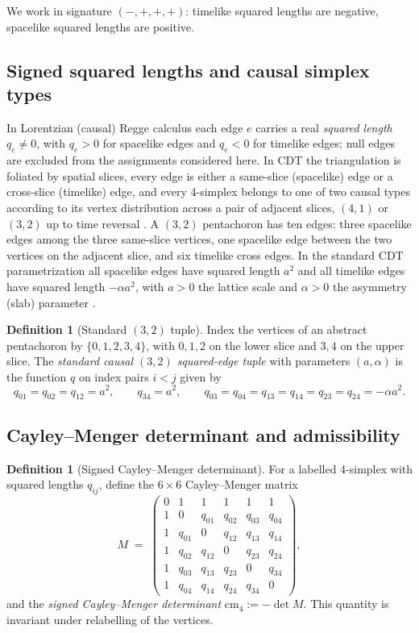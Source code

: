 \documentclass[11pt]{article}
\theoremstyle{definition}
\newtheorem{definition}[theorem]{Definition}
\theoremstyle{remark}
\newcommand{\cm}{\mathrm{cm}_{4}}
\begin{document}
We work in signature $(-,+,+,+)$: timelike squared lengths are negative, spacelike squared lengths are positive.

\subsection{Signed squared lengths and causal simplex types}

In Lorentzian (causal) Regge calculus each edge $e$ carries a real \emph{squared length} $q_{e}\ne 0$, with $q_{e}>0$ for spacelike edges and $q_{e}<0$ for timelike edges; null edges are excluded from the assignments considered here. In CDT the triangulation is foliated by spatial slices, every edge is either a same-slice (spacelike) edge or a cross-slice (timelike) edge, and every 4-simplex belongs to one of two causal types according to its vertex distribution across a pair of adjacent slices, $(4,1)$ or $(3,2)$ up to time reversal \cite{AJL,Loll}. A $(3,2)$ pentachoron has ten edges: three spacelike edges among the three same-slice vertices, one spacelike edge between the two vertices on the adjacent slice, and six timelike cross edges. In the standard CDT parametrization all spacelike edges have squared length $a^{2}$ and all timelike edges have squared length $-\alpha a^{2}$, with $a>0$ the lattice scale and $\alpha>0$ the asymmetry (slab) parameter \cite{AJL}.

\begin{definition}[Standard $(3,2)$ tuple]
\label{def:tuple32}
Index the vertices of an abstract pentachoron by $\{0,1,2,3,4\}$, with $0,1,2$ on the lower slice and $3,4$ on the upper slice. The \emph{standard causal $(3,2)$ squared-edge tuple} with parameters $(a,\alpha)$ is the function $q$ on index pairs $i<j$ given by
\[
q_{01}=q_{02}=q_{12}=a^{2},\qquad q_{34}=a^{2},\qquad
q_{03}=q_{04}=q_{13}=q_{14}=q_{23}=q_{24}=-\alpha a^{2}.
\]
\end{definition}

\subsection{Cayley--Menger determinant and admissibility}

\begin{definition}[Signed Cayley--Menger determinant]
\label{def:cm}
For a labelled 4-simplex with squared lengths $q_{ij}$, define the $6\times 6$ Cayley--Menger matrix
\[
M \;=\;
\begin{pmatrix}
0 & 1 & 1 & 1 & 1 & 1\\
1 & 0 & q_{01} & q_{02} & q_{03} & q_{04}\\
1 & q_{01} & 0 & q_{12} & q_{13} & q_{14}\\
1 & q_{02} & q_{12} & 0 & q_{23} & q_{24}\\
1 & q_{03} & q_{13} & q_{23} & 0 & q_{34}\\
1 & q_{04} & q_{14} & q_{24} & q_{34} & 0
\end{pmatrix},
\]
and the \emph{signed Cayley--Menger determinant} $\cm := -\det M$. This quantity is invariant under relabelling of the vertices.
\end{definition}
\end{document}
